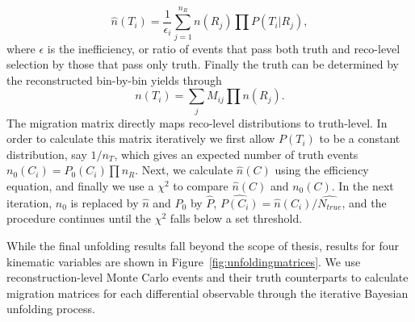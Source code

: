 \begin{equation}
\hat{n}(T_i)=\frac{1}{\epsilon_i}\sum_{j=1}^{n_R} n(R_j)\prod P(T_i|R_j),
\end{equation}
where $\epsilon$ is the inefficiency, or ratio of events that pass both truth and reco-level selection by those that pass only truth. Finally the truth can be determined by the reconstructed bin-by-bin yields through
\begin{equation}
n(T_i)=\sum_j M_{ij} \prod n(R_j).
\end{equation}
The migration matrix directly maps reco-level distributions to truth-level. In order to calculate this matrix iteratively we first allow $P(T_i)$ to be a constant distribution, say $1/n_T$, which gives an expected number of truth events $n_0(C_i)=P_0(C_i)\prod n_R$. Next, we calculate $\hat{n}(C)$ using the efficiency equation, and finally we use a $\chi^2$ to compare $\hat{n}(C)$ and $n_0(C)$. In the next iteration, $n_0$ is replaced by $\hat{n}$ and $P_0$ by $\hat{P}$, $\hat{P(C_i)}=\hat{n}(C_i)/\hat{N_{true}}$, and the procedure continues until the $\chi^2$ falls below a set threshold. 

While the final unfolding results fall beyond the scope of thesis, results for four kinematic variables are shown in Figure~\ref{fig:unfoldingmatrices}. We use reconstruction-level Monte Carlo events and their truth counterparts to calculate migration matrices for each differential observable through the iterative Bayesian unfolding process. 

